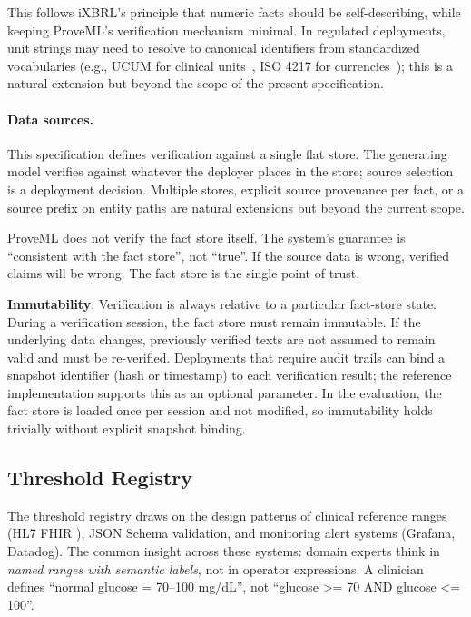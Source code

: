 \documentclass[11pt,a4paper]{article}
\begin{document}
This follows iXBRL's principle that numeric facts should be self-describing, while keeping ProveML's verification mechanism minimal. In regulated deployments, unit strings may need to resolve to canonical identifiers from standardized vocabularies (e.g., UCUM for clinical units~\citep{ucum}, ISO 4217 for currencies~\citep{iso4217}); this is a natural extension but beyond the scope of the present specification.

\paragraph{Data sources.} This specification defines verification against a single flat store. The generating model verifies against whatever the deployer places in the store; source selection is a deployment decision. Multiple stores, explicit source provenance per fact, or a source prefix on entity paths are natural extensions but beyond the current scope.

\noindent ProveML does not verify the fact store itself. The system's guarantee is ``consistent with the fact store'', not ``true''. If the source data is wrong, verified claims will be wrong. The fact store is the single point of trust.

\textbf{Immutability}: Verification is always relative to a particular fact-store state. During a verification session, the fact store must remain immutable. If the underlying data changes, previously verified texts are not assumed to remain valid and must be re-verified. Deployments that require audit trails can bind a snapshot identifier (hash or timestamp) to each verification result; the reference implementation supports this as an optional parameter. In the evaluation, the fact store is loaded once per session and not modified, so immutability holds trivially without explicit snapshot binding.

\subsection{Threshold Registry}

The threshold registry draws on the design patterns of clinical reference ranges (HL7 FHIR \citep{fhir}), JSON Schema validation, and monitoring alert systems (Grafana, Datadog). The common insight across these systems: domain experts think in \textit{named ranges with semantic labels}, not in operator expressions. A clinician defines ``normal glucose = 70--100 mg/dL'', not ``glucose >= 70 AND glucose <= 100''.
\end{document}
